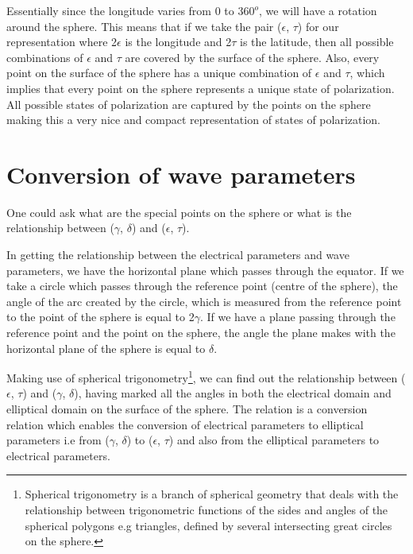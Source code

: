Essentially since the longitude varies from 0 to $360^{o}$, we will have a rotation around the sphere. This means that if we take the pair ($\epsilon$, $\tau$) for our representation where  2$\epsilon$ is the longitude and 2$\tau$ is the latitude, then all possible combinations of $\epsilon$ and $\tau$ are covered by the surface of the sphere.	Also, every point on the surface of the sphere has a unique combination of $\epsilon$ and $\tau$, which implies that every point on the sphere represents a unique state of polarization. All possible states of polarization are captured by the points on the sphere making this a very nice and compact representation of states of polarization.


\section{Conversion of wave parameters}
One could ask what are the special points on the sphere or what is the relationship between ($\gamma$, $\delta$) and ($\epsilon$, $\tau$).  

In getting the relationship between the electrical parameters and wave parameters, we have the horizontal plane which passes through the equator.
If we take a circle which passes through the reference point (centre of the sphere), the angle of the arc created by the circle, which is measured from the reference point to the point of the sphere is equal to 2$\gamma$.
If we have a plane passing through the reference point and the point on the sphere, the angle the plane makes with the horizontal plane of the sphere is equal to $\delta$.

Making use of spherical trigonometry\footnote{Spherical trigonometry is a branch of spherical geometry that deals with the relationship between trigonometric functions of the sides and angles of the spherical polygons e.g triangles, defined by several intersecting great circles on the sphere.}, we can find out the relationship between ($\epsilon$, $\tau$) and ($\gamma$, $\delta$), having marked all the angles in both the electrical domain and elliptical domain on the surface of the sphere. The relation is a conversion relation which enables the conversion of electrical parameters to elliptical parameters i.e from ($\gamma$, $\delta$) to ($\epsilon$, $\tau$) and also from the elliptical parameters to electrical parameters.

